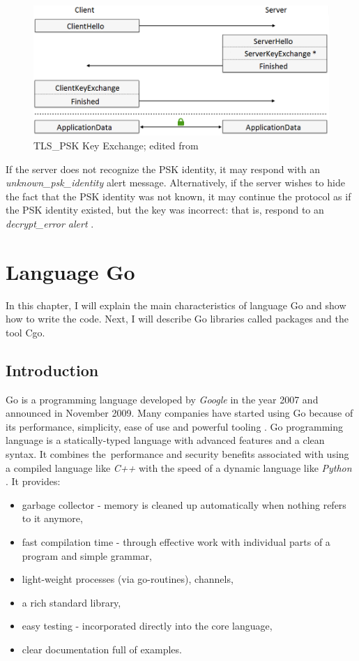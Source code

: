 \documentclass[
  oneside, 12pt, 
  printed, %
  notable,   %
  nolof,     %
  nolot,     %
]{fithesis3}
\begin{document}
\begin{figure}[th]
	\centering
  	\includegraphics[width=1.05\textwidth]{psk-edited}%
   \caption{TLS\_PSK Key Exchange; edited from \cite{taubert}}
   \label{fig:psk}
\end{figure}

If the server does not recognize the PSK identity, it may respond with an 
\textit{unknown\_psk\_identity} alert message.  Alternatively, if the server wishes to hide 
the fact that the PSK identity was not known, it may continue the protocol as if the PSK 
identity existed, but the key was incorrect: that is, respond to an \textit{decrypt\_error 
alert} \cite{eronen2005pre}. 

\chapter{Language Go}\label{go}
In this chapter, I will explain the main characteristics of language Go and show how to write the 
code. Next, I will describe Go libraries called packages and the tool Cgo.

\section{Introduction}
Go is a programming language developed by \textit{Google} in the year 2007 and announced in 
November 2009. Many companies have started using Go because of its performance, simplicity, 
ease of use and powerful tooling \cite{doxsey2016introducing}. Go programming language is a 
statically-typed language with advanced features and a clean syntax. It combines the~performance 
and security benefits associated with using a compiled language like \textit{C++} with the speed of 
a dynamic language like \textit{Python} \cite{harris_2015}. It provides:
\vskip0.1in
\begin{itemize}[leftmargin=2em,rightmargin=1em,itemsep=0.75\parskip,parsep=0em,topsep=0em,partopsep=0em]
\item garbage collector - memory is cleaned up automatically when nothing refers to it 
anymore,
\item fast compilation time - through effective work with individual parts of a program and simple grammar,
\item light-weight processes (via go-routines), channels,
\item a rich standard library,
\item easy testing - incorporated directly into the core language,
\item clear documentation full of examples.
\end{itemize}
\vskip0.1in
\end{document}
